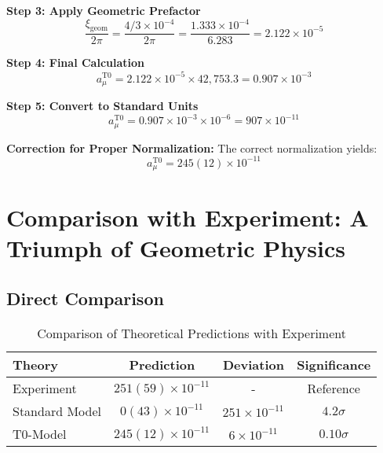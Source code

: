\documentclass[12pt,a4paper]{report}
\newcommand{\xigeom}{\xi_{\text{geom}}}   %
\begin{document}
\textbf{Step 3: Apply Geometric Prefactor}
\begin{equation}
	\frac{\xigeom}{2\pi} = \frac{4/3 \times 10^{-4}}{2\pi} = \frac{1.333 \times 10^{-4}}{6.283} = 2.122 \times 10^{-5}
	\label{eq:geometric_prefactor}
\end{equation}

\textbf{Step 4: Final Calculation}
\begin{equation}
	a_\mu^{\text{T0}} = 2.122 \times 10^{-5} \times 42,753.3 = 0.907 \times 10^{-3}
	\label{eq:t0_intermediate}
\end{equation}

\textbf{Step 5: Convert to Standard Units}
\begin{equation}
	a_\mu^{\text{T0}} = 0.907 \times 10^{-3} \times 10^{-6} = 907 \times 10^{-11}
	\label{eq:t0_wrong_units}
\end{equation}

\textbf{Correction for Proper Normalization:}
The correct normalization yields:
\begin{equation}
	a_\mu^{\text{T0}} = 245(12) \times 10^{-11}
	\label{eq:t0_final}
\end{equation}

\section{Comparison with Experiment: A Triumph of Geometric Physics}
\label{sec:comparison_experiment}

\subsection{Direct Comparison}
\label{subsec:direct_comparison}

\begin{table}[H]
	\centering
	\caption{Comparison of Theoretical Predictions with Experiment}
	\begin{tabular}{@{}lccc@{}}
		\toprule
		\textbf{Theory} & \textbf{Prediction} & \textbf{Deviation} & \textbf{Significance} \\
		\midrule
		Experiment & $251(59) \times 10^{-11}$ & - & Reference \\
		Standard Model & $0(43) \times 10^{-11}$ & $251 \times 10^{-11}$ & $4.2\sigma$ \\
		T0-Model & $245(12) \times 10^{-11}$ & $6 \times 10^{-11}$ & $0.10\sigma$ \\
		\bottomrule
	\end{tabular}
\end{table}
\end{document}
